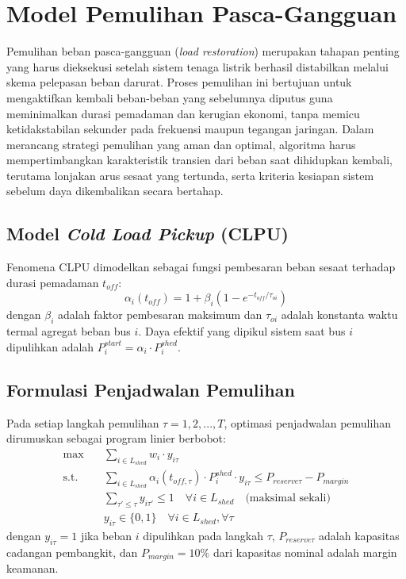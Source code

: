 \section{Model Pemulihan Pasca-Gangguan}
\label{sec:Model_Pemulihan_Pasca_Gangguan}

Pemulihan beban pasca-gangguan (\textit{load restoration}) merupakan tahapan penting yang harus dieksekusi setelah sistem tenaga listrik berhasil distabilkan melalui skema pelepasan beban darurat. Proses pemulihan ini bertujuan untuk mengaktifkan kembali beban-beban yang sebelumnya diputus guna meminimalkan durasi pemadaman dan kerugian ekonomi, tanpa memicu ketidakstabilan sekunder pada frekuensi maupun tegangan jaringan. Dalam merancang strategi pemulihan yang aman dan optimal, algoritma harus mempertimbangkan karakteristik transien dari beban saat dihidupkan kembali, terutama lonjakan arus sesaat yang tertunda, serta kriteria kesiapan sistem sebelum daya dikembalikan secara bertahap.

\subsection{Model \textit{Cold Load Pickup} (CLPU)}
\label{subsec:Model_CLPU}

Fenomena CLPU dimodelkan sebagai fungsi pembesaran beban sesaat terhadap durasi pemadaman $t_{off}$:
\begin{equation}
    \alpha_{i}(t_{off}) = 1 + \beta_{i} \left(1 - e^{-t_{off}/\tau_{oi}}\right)
\end{equation}
dengan $\beta_{i}$ adalah faktor pembesaran maksimum dan $\tau_{oi}$ adalah konstanta waktu termal agregat beban bus $i$. Daya efektif yang dipikul sistem saat bus $i$ dipulihkan adalah $P_{i}^{start}=\alpha_{i}\cdot P_{i}^{shed}$.

\subsection{Formulasi Penjadwalan Pemulihan}
\label{subsec:Formulasi_Penjadwalan_Pemulihan}

Pada setiap langkah pemulihan $\tau=1,2,...,T$, optimasi penjadwalan pemulihan dirumuskan sebagai program linier berbobot:
\begin{equation}
    \begin{aligned}
        \max \quad & \sum_{i\in L_{shed}} w_{i}\cdot y_{i\tau} \\
        \text{s.t.} \quad & \sum_{i\in L_{shed}} \alpha_{i}(t_{off,\tau}) \cdot P_{i}^{shed} \cdot y_{i\tau} \le P_{reserve\tau} - P_{margin} \\
        & \sum_{\tau'\le\tau} y_{i\tau'} \le 1 \quad \forall i\in L_{shed} \quad \text{(maksimal sekali)} \\
        & y_{i\tau} \in \{0,1\} \quad \forall i\in L_{shed}, \forall\tau
    \end{aligned}
\end{equation}
dengan $y_{i\tau}=1$ jika beban $i$ dipulihkan pada langkah $\tau$, $P_{reserve\tau}$ adalah kapasitas cadangan pembangkit, dan $P_{margin}=10\%$ dari kapasitas nominal adalah margin keamanan.

